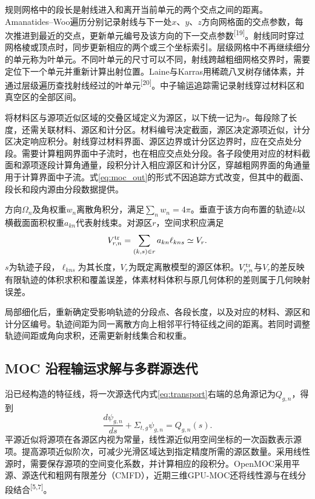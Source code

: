 \documentclass[UTF8, zihao=-4, fontset=none, a4paper]{ctexart}
\newcommand{\upcite}[1]{\textsuperscript{[#1]}}
\begin{document}
规则网格中的段长是射线进入和离开当前单元的两个交点之间的距离。Amanatides–Woo遍历分别记录射线与下一处$x$、$y$、$z$方向网格面的交点参数，每次推进到最近的交点，更新单元编号及该方向的下一交点参数\upcite{19}。射线同时穿过网格棱或顶点时，同步更新相应的两个或三个坐标索引。层级网格中不再继续细分的单元称为叶单元。不同叶单元的尺寸可以不同，射线跨越粗细网格交界时，需要定位下一个单元并重新计算出射位置。Laine与Karras用稀疏八叉树存储体素，并通过层级遍历查找射线经过的叶单元\upcite{20}。中子输运追踪需记录射线穿过材料区和真空区的全部区间。

将材料区与源项近似区域的交叠区域定义为源区，以下统一记为$r$。每段除了长度，还需关联材料、源区和计分区。材料编号决定截面，源区决定源项近似，计分区决定响应积分。射线穿过材料界面、源区边界或计分区边界时，应在交点处分段。需要计算粗网界面中子流时，也在相应交点处分段。各子段使用对应的材料截面和源项逐段计算角通量，段积分计入相应源区和计分区，穿越粗网界面的角通量用于计算界面中子流。式\eqref{eq:moc_out}的形式不因追踪方式改变，但其中的截面、段长和段内源由分段数据提供。

方向$\Omega_n$及角权重$w_n$离散角积分，满足$\sum_nw_n=4\pi$。垂直于该方向布置的轨迹$k$以横截面面积权重$a_{kn}$代表射线束。对源区$r$，空间求积应满足
\begin{equation}
V_{r,n}^{\rm tr}=\sum_{(k,s)\in r}a_{kn}\ell_{kns}\simeq V_r.
\label{eq:volume}
\end{equation}
$s$为轨迹子段，$\ell_{kns}$为其长度，$V_r$为既定离散模型的源区体积。$V_{r,n}^{\rm tr}$与$V_r$的差反映有限轨迹的体积求积和覆盖误差，体素材料体积与原几何体积的差则属于几何映射误差。

局部细化后，重新确定受影响轨迹的分段点、各段长度，以及对应的材料、源区和计分区编号。轨迹间距为同一离散方向上相邻平行特征线之间的距离。若同时调整轨迹间距或角向求积，还需更新射线集合和权重。

\subsection{MOC 沿程输运求解与多群源迭代}
沿已经构造的特征线，将一次源迭代内式\eqref{eq:transport}右端的总角源记为$Q_{g,n}$，得到
\begin{equation}
\frac{d\psi_{g,n}}{ds}+\Sigma_{t,g}\psi_{g,n}=Q_{g,n}(s).
\label{eq:along}
\end{equation}
平源近似将源项在各源区内视为常量，线性源近似用空间坐标的一次函数表示源项。提高源项近似阶次，可减少光滑区域达到指定精度所需的源区数量。采用线性源时，需要保存源项的空间变化系数，并计算相应的段积分。OpenMOC采用平源、源迭代和粗网有限差分（CMFD），近期三维GPU-MOC还将线性源与在线分段结合\upcite{5,7}。
\end{document}
